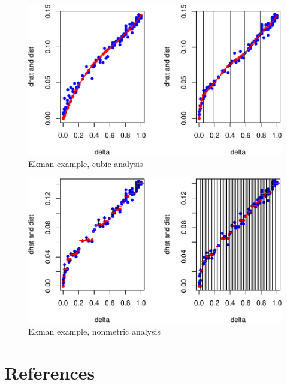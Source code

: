 \documentclass[
  12pt,
]{article}
\begin{document}
\begin{figure}

{\centering \includegraphics{smacofManual_files/figure-latex/hekmancubic-1} 

}

\caption{Ekman example, cubic analysis}\label{fig:hekmancubic}
\end{figure}
\begin{figure}

{\centering \includegraphics{smacofManual_files/figure-latex/hekmanordinal-1} 

}

\caption{Ekman example, nonmetric analysis}\label{fig:hekmanordinal}
\end{figure}

\section*{References}\label{references}
\end{document}
